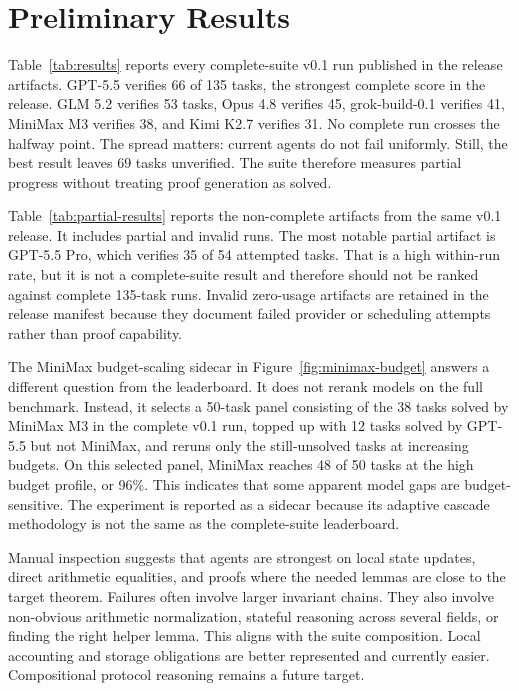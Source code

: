 \documentclass[conference]{IEEEtran}
\begin{document}
\section{Preliminary Results}

Table~\ref{tab:results} reports every complete-suite v0.1 run published in the
release artifacts. GPT-5.5 verifies 66 of 135 tasks, the strongest complete
score in the release. GLM 5.2 verifies 53 tasks, Opus 4.8 verifies 45,
grok-build-0.1 verifies 41, MiniMax M3 verifies 38, and Kimi K2.7 verifies 31.
No complete run crosses the halfway point. The spread matters: current agents
do not fail uniformly. Still, the best result leaves 69 tasks unverified.
The suite therefore measures partial progress without treating proof generation
as solved.




Table~\ref{tab:partial-results} reports the non-complete artifacts from the
same v0.1 release. It includes partial and invalid runs. The most notable
partial artifact is GPT-5.5 Pro, which verifies 35 of 54 attempted tasks. That
is a high within-run rate, but it is not a complete-suite result and therefore
should not be ranked against complete 135-task runs. Invalid zero-usage
artifacts are retained in the release manifest because they document failed
provider or scheduling attempts rather than proof capability.

The MiniMax budget-scaling sidecar in Figure~\ref{fig:minimax-budget} answers a
different question from the leaderboard. It does not rerank models on the full
benchmark. Instead, it selects a 50-task panel consisting of the 38 tasks solved
by MiniMax M3 in the complete v0.1 run, topped up with 12 tasks solved by
GPT-5.5 but not MiniMax, and reruns only the still-unsolved tasks at increasing
budgets. On this selected panel, MiniMax reaches 48 of 50 tasks at the high
budget profile, or 96\%. This indicates that some apparent model gaps are
budget-sensitive. The experiment is reported as a sidecar because its adaptive
cascade methodology is not the same as the complete-suite leaderboard.

Manual inspection suggests that agents are strongest on local state updates,
direct arithmetic equalities, and proofs where the needed lemmas are close to
the target theorem. Failures often involve larger invariant chains. They also
involve non-obvious arithmetic normalization, stateful reasoning across several
fields, or finding the right helper lemma. This aligns with the suite
composition. Local accounting and storage obligations are better represented and
currently easier. Compositional protocol reasoning remains a future target.
\end{document}
